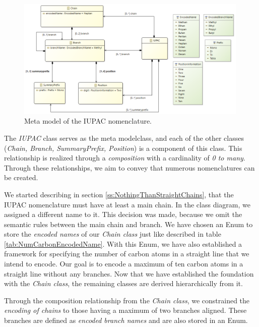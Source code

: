 \documentclass[
fontsize=11pt,
paper=a4,
abstract=true,
numbers=noenddot,
listof=totoc,
bibliography=totoc,
twoside,
open=right,
cleardoublepage=plain,
parskip=half+, %
BCOR=1cm, %
]{scrreprt}
\newcommand{\dashAndSpace}{\textendash \space}
\newcommand{\metamodel}{meta model}
\begin{document}
\begin{figure}[H]
\centering
\includegraphics[width=0.99\textwidth]{./Screenshots/Meta_Modell_With_Nesting.png}
\caption{Meta model of the IUPAC nomenclature.}
\label{fig:SSIUPACMetaModel}
\end{figure}

The \emph{IUPAC} class serves as the \metamodel\space class, and each of the other classes (\emph{Chain, Branch, SummaryPrefix, Position}) is a component of this class. This relationship is realized through a \emph{composition} with a cardinality of \emph{0 to many}. Through these relationships, we aim to convey that numerous nomenclatures can be created.

We started describing in section \ref{ss:NothingThanStraightChains}, that the IUPAC nomenclature must have at least a main chain. In the class diagram, we assigned a different name to it. This decision was made, because we omit the semantic rules between the main chain and branch. We have chosen an Enum to store the \emph{encoded names} of our \emph{Chain class} \dashAndSpace just like described in table \ref{tab:NumCarbonEncodedName}.
With this Enum, we have also established a framework for specifying the number of carbon atoms in a straight line that we intend to encode. Our goal is to encode a maximum of ten carbon atoms in a straight line without any branches. Now that we have established the foundation with the \emph{Chain class}, the remaining classes are derived hierarchically from it.

Through the composition relationship from the \emph{Chain class}, we constrained the \emph{encoding of chains} to those having a maximum of two branches aligned. These branches are defined as \emph{encoded branch names} and are also stored in an Enum. \\
\end{document}
